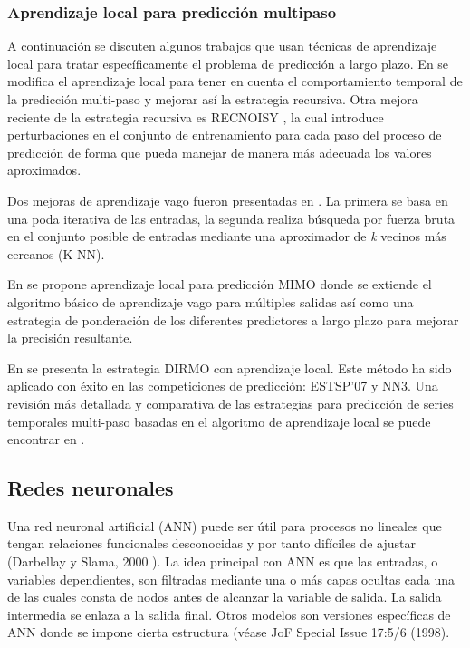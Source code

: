 \documentclass{llncs}
\begin{document}
\subsubsection{Aprendizaje local para predicción multipaso\\}
A continuación se discuten algunos trabajos que usan técnicas de aprendizaje local para tratar específicamente el problema de predicción a largo plazo.  En \cite{McNames1998112} \cite{Bontempi199932} se modifica el aprendizaje local para tener en cuenta el comportamiento temporal de la predicción multi-paso y mejorar así la estrategia recursiva. Otra mejora reciente de la estrategia recursiva es RECNOISY \cite{BenTaieb2011}, la cual introduce perturbaciones en el conjunto de entrenamiento para cada paso del proceso de predicción de forma que pueda manejar de manera más adecuada los valores aproximados. 

Dos mejoras de aprendizaje vago fueron presentadas en \cite{Sorjamaa2005509}. La primera se basa en una poda iterativa de las entradas, la segunda realiza búsqueda por fuerza bruta en el conjunto posible de entradas mediante una aproximador de \emph{k} vecinos más cercanos (K-NN).

En \cite{Bontempi2008145} se propone aprendizaje local para predicción MIMO donde se extiende el algoritmo básico de aprendizaje vago para múltiples salidas así como una estrategia de ponderación de los diferentes predictores a largo plazo para mejorar la precisión resultante.

En  \cite{BenTaieb2009}  \cite{BenTaieb20101950} se presenta la estrategia DIRMO con aprendizaje local. Este método ha sido aplicado con éxito en las competiciones de predicción: ESTSP'07 \cite{BenTaieb2009} y NN3\cite{BenTaieb20101950}.
Una revisión más detallada y comparativa de las estrategias para predicción de series temporales multi-paso basadas en el algoritmo de aprendizaje local se puede encontrar en \cite{Roberts1982808}.


\subsection{Redes neuronales}

Una red neuronal artificial (ANN) puede ser útil para procesos no lineales que tengan relaciones funcionales desconocidas y por tanto difíciles de ajustar (Darbellay y Slama, 2000 \cite{Darbellay200071}). La idea principal con ANN es que las entradas, o variables dependientes, son filtradas mediante una o más capas ocultas cada una de las cuales consta de nodos antes de alcanzar la variable de salida. La salida intermedia se enlaza a la salida final. Otros modelos son versiones específicas de ANN donde se impone cierta estructura (véase JoF Special Issue 17:5/6 (1998).
\end{document}
